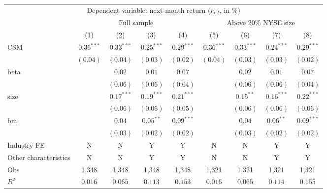 \documentclass[
]{article}
\begin{document}
\begin{tabular}{lcccccccc}
  \hline \multicolumn{9}{c}{Dependent variable: next-month return ($r_{i,t}$, in \%)} \\
 \cmidrule(l){2-9}  & \multicolumn{4}{c}{Full sample} & \multicolumn{4}{c}{Above 20\% NYSE size} \\
 \cmidrule(l){2-5} \cmidrule(l){6-9}  \vspace{5pt} & (1) & (2) & (3) & (4) & (5) & (6) & (7) & (8) \\ 
  CSM & $0.36^{***}$ & $0.33^{***}$ & $0.25^{***}$ & $0.29^{***}$ & $0.36^{***}$ & $0.33^{***}$ & $0.24^{***}$ & $0.29^{***}$ \\ 
   & $(0.04)$ & $(0.04)$ & $(0.03)$ & $(0.02)$ & $(0.04)$ & $(0.03)$ & $(0.03)$ & $(0.02)$ \\ 
  beta &  & $0.02$ & $0.01$ & $0.07$ &  & $0.02$ & $0.01$ & $0.07$ \\ 
   &  & $(0.06)$ & $(0.06)$ & $(0.04)$ &  & $(0.06)$ & $(0.06)$ & $(0.04)$ \\ 
  size &  & $0.17^{***}$ & $0.19^{***}$ & $0.21^{***}$ &  & $0.15^{**}$ & $0.16^{***}$ & $0.22^{***}$ \\ 
   &  & $(0.06)$ & $(0.06)$ & $(0.05)$ &  & $(0.06)$ & $(0.06)$ & $(0.06)$ \\ 
  bm &  & $0.04$ & $0.05^{**}$ & $0.09^{***}$ &  & $0.04$ & $0.06^{**}$ & $0.09^{***}$ \\ 
   \vspace{5pt} &  & $(0.03)$ & $(0.02)$ & $(0.02)$ &  & $(0.03)$ & $(0.02)$ & $(0.02)$ \\ 
  Industry FE & N & N & Y & Y & N & N & Y & Y \\ 
   \vspace{5pt}Other characteristics & N & N & Y & Y & N & N & Y & Y \\ 
  Obs & 1,348 & 1,348 & 1,348 & 1,348 & 1,321 & 1,321 & 1,321 & 1,321 \\ 
  $R^2$ & $0.016$ & $0.065$ & $0.113$ & $0.153$ & $0.016$ & $0.065$ & $0.114$ & $0.155$ \\ 
   \bottomrule\end{tabular}
\end{document}
